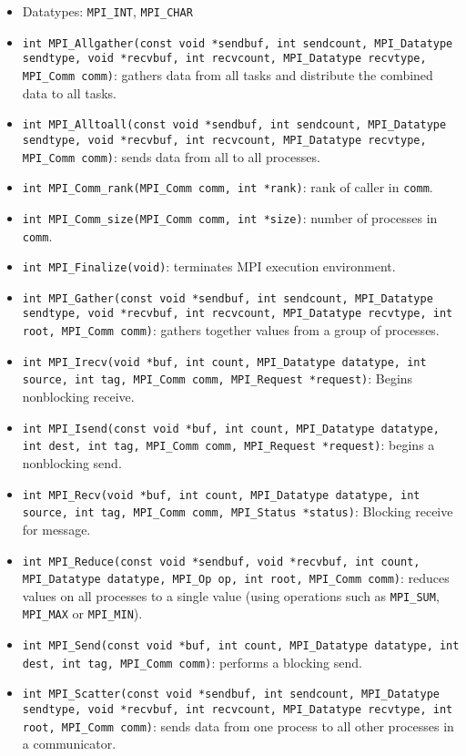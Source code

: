 \documentclass[11pt]{scrartcl}
\begin{document}
\begin{itemize}
    \item Datatypes: \texttt{MPI\_INT}, \texttt{MPI\_CHAR}
    \item \texttt{int MPI\_Allgather(const void *sendbuf, int sendcount, MPI\_Datatype sendtype,
    void *recvbuf, int recvcount, MPI\_Datatype recvtype, MPI\_Comm comm)}: gathers data from 
    all tasks and distribute the combined data to all tasks.
    \item \texttt{int MPI\_Alltoall(const void *sendbuf, int sendcount, MPI\_Datatype sendtype,
    void *recvbuf, int recvcount, MPI\_Datatype recvtype, MPI\_Comm comm)}: sends data from 
    all to all processes.
    \item \texttt{int MPI\_Comm\_rank(MPI\_Comm comm, int *rank)}: rank of caller in 
    \texttt{comm}.
    \item \texttt{int MPI\_Comm\_size(MPI\_Comm comm, int *size)}: number of processes in 
    \texttt{comm}.
    \item \texttt{int MPI\_Finalize(void)}: terminates MPI execution environment.
    \item \texttt{int MPI\_Gather(const void *sendbuf, int sendcount, MPI\_Datatype sendtype,
    void *recvbuf, int recvcount, MPI\_Datatype recvtype, int root, MPI\_Comm comm)}: gathers 
    together values from a group of processes.
    \item \texttt{int MPI\_Irecv(void *buf, int count, MPI\_Datatype datatype, int source,
    int tag, MPI\_Comm comm, MPI\_Request *request)}: Begins nonblocking receive.
    \item \texttt{int MPI\_Isend(const void *buf, int count, MPI\_Datatype datatype, int dest, 
    int tag, MPI\_Comm comm, MPI\_Request *request)}: begins a nonblocking send.
    \item \texttt{int MPI\_Recv(void *buf, int count, MPI\_Datatype datatype, int source, 
    int tag, MPI\_Comm comm, MPI\_Status *status)}: Blocking receive for message.
    \item \texttt{int MPI\_Reduce(const void *sendbuf, void *recvbuf, int count, MPI\_Datatype 
    datatype, MPI\_Op op, int root, MPI\_Comm comm)}: reduces values on all processes to a 
    single value (using operations such as \texttt{MPI\_SUM}, \texttt{MPI\_MAX} or 
    \texttt{MPI\_MIN}).
    \item \texttt{int MPI\_Send(const void *buf, int count, MPI\_Datatype datatype, int dest, 
    int tag, MPI\_Comm comm)}: performs a blocking send.
    \item \texttt{int MPI\_Scatter(const void *sendbuf, int sendcount, MPI\_Datatype sendtype, 
    void *recvbuf, int recvcount, MPI\_Datatype recvtype, int root, MPI\_Comm comm)}: sends 
    data from one process to all other processes in a communicator.
\end{itemize}
\end{document}
